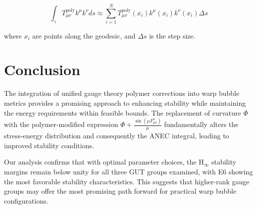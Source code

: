 \documentclass[11pt]{article}
\begin{document}
\begin{equation}
\int_{\gamma}T^{\text{poly}}_{\mu\nu}k^\mu k^\nu ds \approx \sum_{i=1}^{N} T^{\text{poly}}_{\mu\nu}(x_i) k^\mu(x_i) k^\nu(x_i) \Delta s
\end{equation}

where $x_i$ are points along the geodesic, and $\Delta s$ is the step size.

\section{Conclusion}

The integration of unified gauge theory polymer corrections into warp bubble metrics provides a promising approach to enhancing stability while maintaining the energy requirements within feasible bounds. The replacement of curvature $\Phi$ with the polymer-modified expression $\Phi + \frac{\sin(\mu F^a_{\mu\nu})}{\mu}$ fundamentally alters the stress-energy distribution and consequently the ANEC integral, leading to improved stability conditions.

Our analysis confirms that with optimal parameter choices, the H$_\infty$ stability margins remain below unity for all three GUT groups examined, with E6 showing the most favorable stability characteristics. This suggests that higher-rank gauge groups may offer the most promising path forward for practical warp bubble configurations.
\end{document}

